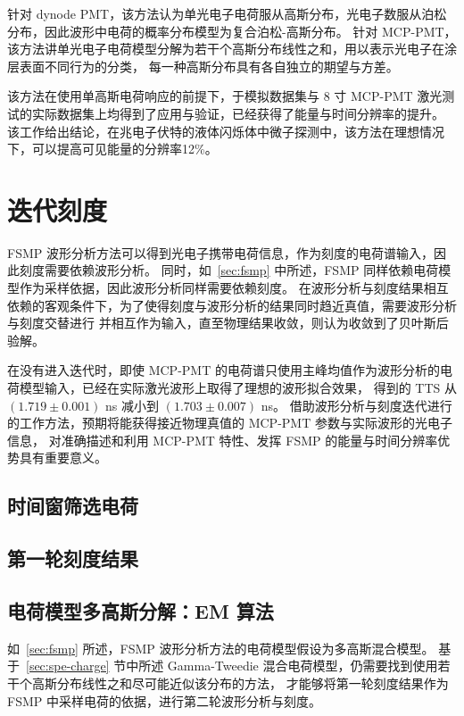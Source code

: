 针对 dynode PMT，该方法认为单光电子电荷服从高斯分布，光电子数服从泊松分布，因此波形中电荷的概率分布模型为复合泊松-高斯分布。
针对 MCP-PMT，该方法讲单光电子电荷模型分解为若干个高斯分布线性之和，用以表示光电子在涂层表面不同行为的分类，
每一种高斯分布具有各自独立的期望与方差。

该方法在使用单高斯电荷响应的前提下，于模拟数据集与 8 寸 MCP-PMT 激光测试的实际数据集上均得到了应用与验证，已经获得了能量与时间分辨率的提升。
该工作给出结论，在兆电子伏特的液体闪烁体中微子探测中，该方法在理想情况下，可以提高可见能量的分辨率12\%。

\section{迭代刻度}
FSMP 波形分析方法可以得到光电子携带电荷信息，作为刻度的电荷谱输入，因此刻度需要依赖波形分析。
同时，如~\ref{sec:fsmp} 中所述，FSMP 同样依赖电荷模型作为采样依据，因此波形分析同样需要依赖刻度。
在波形分析与刻度结果相互依赖的客观条件下，为了使得刻度与波形分析的结果同时趋近真值，需要波形分析与刻度交替进行
并相互作为输入，直至物理结果收敛，则认为收敛到了贝叶斯后验解。

在没有进入迭代时，即使 MCP-PMT 的电荷谱只使用主峰均值作为波形分析的电荷模型输入，已经在实际激光波形上取得了理想的波形拟合效果，
得到的 TTS 从 $(1.719\pm0.001)$ ns 减小到 $(1.703\pm0.007)$ ns\cite{wangFastStochasticMatching2024a}。
借助波形分析与刻度迭代进行的工作方法，预期将能获得接近物理真值的 MCP-PMT 参数与实际波形的光电子信息，
对准确描述和利用 MCP-PMT 特性、发挥 FSMP 的能量与时间分辨率优势具有重要意义。

\subsection{时间窗筛选电荷}

\subsection{第一轮刻度结果}

\subsection{电荷模型多高斯分解：EM 算法}
如~\ref{sec:fsmp} 所述，FSMP 波形分析方法的电荷模型假设为多高斯混合模型。
基于~\ref{sec:spe-charge} 节中所述 Gamma-Tweedie 混合电荷模型，仍需要找到使用若干个高斯分布线性之和尽可能近似该分布的方法，
才能够将第一轮刻度结果作为 FSMP 中采样电荷的依据，进行第二轮波形分析与刻度。

